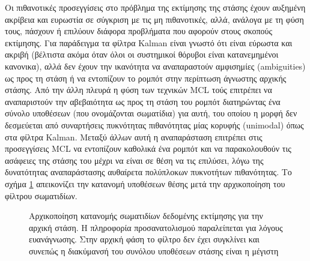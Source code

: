 Οι πιθανοτικές προσεγγίσεις στο πρόβλημα της εκτίμησης της στάσης έχουν
αυξημένη ακρίβεια και ευρωστία σε σύγκριση με τις μη πιθανοτικές, αλλά, ανάλογα
με τη φύση τους, πάσχουν ή επιλύουν διάφορα προβλήματα που αφορούν στους σκοπούς
εκτίμησης. Για παράδειγμα τα φίλτρα Kalman είναι γνωστό ότι είναι εύρωστα
και ακριβή (βέλτιστα ακόμα όταν όλοι οι συστημικοί θόρυβοι είναι κατανεμημένοι
κανονικα), αλλά δεν έχουν την ικανότητα να αναπαραστούν αμφισημίες
(ambiguities) ως προς τη στάση ή να εντοπίζουν το ρομπότ στην περίπτωση
άγνωστης αρχικής στάσης. Από την άλλη πλευρά η φύση των τεχνικών MCL
\cite{Dellaert} τούς επιτρέπει να αναπαριστούν την αβεβαιότητα ως προς τη στάση
του ρομπότ διατηρώντας ένα σύνολο υποθέσεων (που ονομάζονται σωματίδια) για
αυτή, του οποίου η μορφή δεν δεσμεύεται από συναρτήσεις πυκνότητας πιθανότητας
μίας κορυφής (unimodal) όπως στα φίλτρα Kalman. Μεταξύ άλλων αυτή η
αναπαράσταση επιτρέπει στις προσεγγίσεις MCL να εντοπίζουν καθολικά ένα ρομπότ
και να παρακολουθούν τις ασάφειες της στάσης του μέχρι να είναι σε θέση να τις
επιλύσει, λόγω της δυνατότητας αναπαράστασης αυθαίρετα πολύπλοκων πυκνοτήτων
πιθανότητας. Το σχήμα \ref{fig:pf_init} απεικονίζει την κατανομή υποθέσεων θέσης
μετά την αρχικοποίηση του φίλτρου σωματιδίων.

\begin{figure}[htbp]\centering
  
  \caption{\small Αρχικοποίηση κατανομής σωματιδίων δεδομένης εκτίμησης για την
           αρχική στάση. Η πληροφορία προσανατολισμού παραλείπεται για λόγους
           ευανάγνωσης. Στην αρχική φάση το φίλτρο δεν έχει συγκλίνει και
           συνεπώς η διακύμανσή του συνόλου υποθέσεων στάσης είναι η μέγιστη}
  \label{fig:pf_init}
\end{figure}

